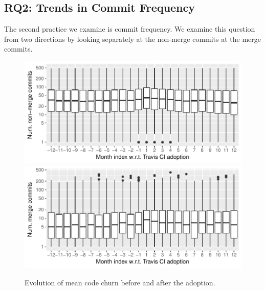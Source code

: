 



%
%



\subsection{RQ2: Trends in Commit Frequency}

The second practice we examine is commit frequency.
We examine this question from two directions by looking separately at the non-merge commits at the merge commits. 

\begin{figure}[t]
\centering
\includegraphics[width=\columnwidth, clip=true, trim=0 0 0 0]{figures/freq-non-merge.pdf}
\includegraphics[width=\columnwidth, clip=true, trim=0 0 0 0]{figures/freq-merge.pdf}
\caption{Evolution of mean code churn before and after the \Tvis adoption.}
\label{fig:freq}
\end{figure}


